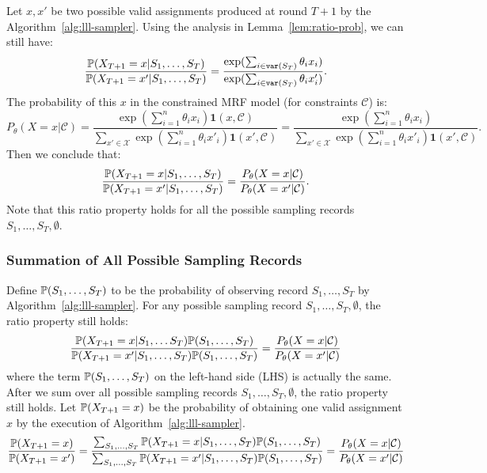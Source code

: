 Let $x,x'$ be two possible valid assignments produced at round $T+1$ by the
Algorithm~\ref{alg:lll-sampler}. Using the analysis in
Lemma~\ref{lem:ratio-prob}, we can still have:
\begin{equation*}
    \frac{\mathbb{P}(X_{T+1}=x|S_1,\ldots, S_T)}{\mathbb{P}(X_{T+1}=x'|S_1,\ldots, S_T)}=\frac{\exp(\sum_{i\in\mathtt{var}(S_T)}\theta_ix_i)}{\exp(\sum_{i\in\mathtt{var}(S_T)}\theta_ix'_i)}.
\end{equation*}
The probability of this $x$ in the constrained MRF model  (for constraints  $\mathcal{C}$) is:
\begin{equation*}
    P_{\theta}(X=x|\mathcal{C})=\frac{\exp(\sum_{i=1}^n\theta_i x_i)\mathbf{1}(x,\mathcal{C})}{\sum_{x'\in\mathcal{X}}  \exp(\sum_{i=1}^n\theta_i x'_i)\mathbf{1}\left(x',\mathcal{C}\right)}
    =\frac{\exp(\sum_{i=1}^n\theta_i x_i)}{\sum_{x'\in\mathcal{X}}  \exp(\sum_{i=1}^n\theta_i x'_i)\mathbf{1}\left(x',\mathcal{C}\right)}.
\end{equation*}
Then we conclude that:
\begin{equation*}
    \frac{\mathbb{P}(X_{T+1}=x|S_1,\ldots, S_T)}{\mathbb{P}(X_{T+1}=x'|S_1,\ldots, S_T)}=\frac{P_{\theta}(X=x|\mathcal{C})}{P_{\theta}(X=x'|\mathcal{C})}.
\end{equation*}
Note that this ratio property holds for all the possible sampling records $S_1,\ldots, S_T,\emptyset$.

\subsubsection*{Summation of All Possible Sampling Records} Define $\mathbb{P}(S_1,\ldots,S_T)$ to be the probability of observing record
$S_1,\ldots,S_T$ by Algorithm~\ref{alg:lll-sampler}. For any possible sampling
record $S_1,\ldots,S_{T}, \emptyset$, the ratio property still holds:
\begin{equation*}
    \frac{\mathbb{P}(X_{T+1}=x|S_1,\ldots S_T)\mathbb{P}(S_1,\ldots,S_T)}{\mathbb{P}(X_{T+1}=x'|S_1,\ldots,S_T)\mathbb{P}(S_1,\ldots,S_T)}=\frac{P_{\theta}(X=x|\mathcal{C})}{P_{\theta}(X=x'|\mathcal{C})}
\end{equation*}
where the term $\mathbb{P}(S_1,\ldots,S_T)$ on the left-hand side (LHS) is actually the same.
After we sum over all possible sampling records $S_1,\ldots,S_{T},\emptyset$, the ratio property still holds. Let $\mathbb{P}(X_{T+1}=x)$ be the probability of obtaining one valid assignment $x$ by the execution of Algorithm~\ref{alg:lll-sampler}.
\begin{equation} \label{eq:ratio-final}
    \frac{\mathbb{P}(X_{T+1}=x)}{\mathbb{P}(X_{T+1}=x')}=\frac{\sum_{S_1,\ldots,S_T}\mathbb{P}(X_{T+1}=x|S_1,\ldots,S_T)\mathbb{P}(S_1,\ldots,S_T)}{\sum_{S_1,\ldots,S_T}\mathbb{P}(X_{T+1}=x'|S_1,\ldots,S_T)\mathbb{P}(S_1,\ldots,S_T)}=\frac{P_{\theta}(X=x|\mathcal{C})}{P_{\theta}(X=x'|\mathcal{C})}
\end{equation}

